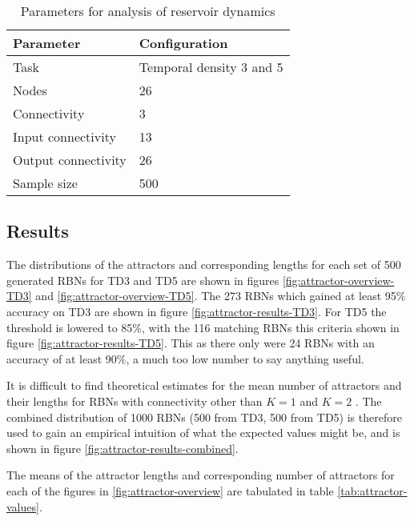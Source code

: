 \begin{table}[h]
    \centering
    \caption{Parameters for analysis of reservoir dynamics}
    \label{tab:reservoir-dynamics-parameters}
    \begin{tabular}{ll}
        \hline
        \textbf{Parameter} & \textbf{Configuration} \\
        \hline
        \hline
        Task                & Temporal density 3 and 5  \\
        Nodes               & 26                        \\
        Connectivity        & 3                         \\
        Input connectivity  & 13                        \\
        Output connectivity & 26                        \\
        Sample size         & 500 \\
        \hline
    \end{tabular}
\end{table}

\subsection{Results}

The distributions of the attractors and corresponding lengths for each set of 500 generated RBNs for TD3 and TD5 are shown in figures \ref{fig:attractor-overview-TD3} and \ref{fig:attractor-overview-TD5}.
The 273 RBNs which gained at least 95\% accuracy on TD3 are shown in figure \ref{fig:attractor-results-TD3}.
For TD5 the threshold is lowered to 85\%,
with the 116 matching RBNs this criteria shown in figure \ref{fig:attractor-results-TD5}.
This as there only were 24 RBNs with an accuracy of at least 90\%,
a much too low number to say anything useful.

It is difficult to find theoretical estimates for the mean number of attractors and their lengths for RBNs with connectivity other than $ K = 1 $ \cite{drossel2005number} and $ K = 2 $ \cite{samuelsson2003superpolynomial}.
The combined distribution of 1000 RBNs (500 from TD3, 500 from TD5) is therefore used to gain an empirical intuition of what the expected values might be,
and is shown in figure \ref{fig:attractor-results-combined}.

The means of the attractor lengths and corresponding number of attractors for each of the figures in \ref{fig:attractor-overview} are tabulated in table \ref{tab:attractor-values}.

